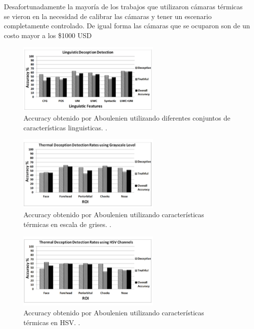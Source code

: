 \begin{onehalfspacing}
Desafortunadamente la mayoría de los trabajos que utilizaron cámaras térmicas se vieron en la necesidad de calibrar las cámaras y tener un escenario completamente controlado. De igual forma las cámaras que se ocuparon son de un costo mayor a los \$1000 USD
\begin{figure}[h!]
	\centering
	\includegraphics[width=7cm,keepaspectratio]{XX_Figures/Fig_Veronica_Linguistic.png}
	\caption{\footnotesize Accuracy obtenido por Aboulenien utilizando diferentes conjuntos de características linguisticas. \cite{Abouelenien2016AnalyzingApproach} .}
	\label{fig:Fig_Veronica_Linguistic}
\end{figure}

\begin{figure}[h!]
	\centering
	\includegraphics[width=7cm,keepaspectratio]{XX_Figures/Fig_Veronica_Termico_GS.png}
	\caption{\footnotesize Accuracy obtenido por Aboulenien utilizando características térmicas en escala de grises. \cite{Abouelenien2016AnalyzingApproach}.}
	\label{fig:Fig_Veronica_Termico_GS}
\end{figure}

\begin{figure}[h!]
	\centering
	\includegraphics[width=7cm,keepaspectratio]{XX_Figures/Fig_Veronica_Termico_HSV.png}
	\caption{\footnotesize Accuracy obtenido por Aboulenien utilizando características térmicas en HSV. \cite{Abouelenien2016AnalyzingApproach}.}
	\label{fig:Fig_Veronica_Termico_HSV}
\end{figure}


\end{onehalfspacing}
